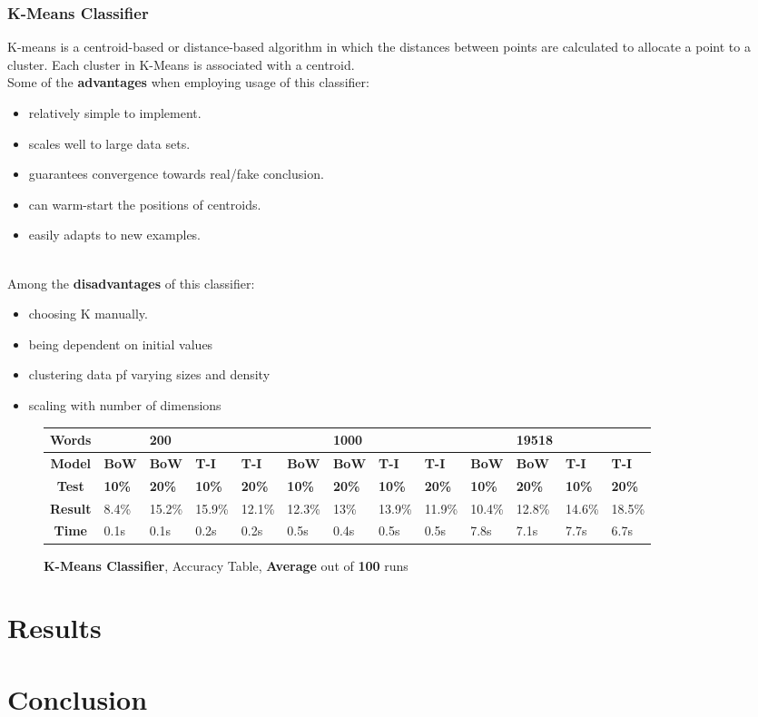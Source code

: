 \documentclass{article}
\begin{document}
	\subsubsection{K-Means Classifier}
K-means is a centroid-based or distance-based algorithm in which the distances between points are calculated to allocate a point to a cluster.
Each cluster in K-Means is associated with a centroid. \\
Some of the \textbf{advantages} when employing usage of this classifier:
\begin{itemize}
\item relatively simple to implement.
\item scales well to large data sets.
\item guarantees convergence towards real/fake conclusion.
\item can warm-start the positions of centroids.
\item easily adapts to new examples.
\end{itemize}
\\
Among the \textbf{disadvantages} of this classifier:
\begin{itemize}
\item choosing K manually.
\item being dependent on initial values
\item clustering data pf varying sizes and density
\item scaling with number of dimensions
\end{itemize}
	\begin{figure}[H]
		\begin{tabular}{||c||l|l|l|l||l|l|l|l||l|l|l|l||}
			\hline
			\textbf{Words} &  & \textbf{200} & & & &\textbf{1000} & & & & \textbf{19518} &  & \\ \hline 
			\textbf{Model} & \textbf{BoW} & \textbf{BoW} & \textbf{T-I} & \textbf{T-I} &\textbf{BoW} & \textbf{BoW} & \textbf{T-I} & \textbf{T-I} & \textbf{BoW} & \textbf{BoW} & \textbf{T-I} & \textbf{T-I}\\ \hline
			\textbf{Test} & \textbf{10\%} & \textbf{20\%} & \textbf{10\%} & \textbf{20\%} & \textbf{10\%} & \textbf{20\%} & \textbf{10\%} & \textbf{20\%} & \textbf{10\%} & \textbf{20\%} & \textbf{10\%} & \textbf{20\%} \\ \hline \hline  
			\textbf{Result} & 8.4\% & 15.2\% & 15.9\% & 12.1\% & 12.3\% & 13\% & 13.9\% & 11.9\% & 10.4\% & 12.8\% & 14.6\% & 18.5\% \\ \hline 
			\textbf{Time} &0.1s & 0.1s & 0.2s & 0.2s & 0.5s & 0.4s & 0.5s & 0.5s & 7.8s & 7.1s & 7.7s & 6.7s \\ \hline 
		\end{tabular}
		\caption{\textbf{K-Means Classifier}, Accuracy Table, \textbf{Average} out of \textbf{100} runs}
	\end{figure}

	\section{Results}
	
	\section{Conclusion}
	
	\begin{thebibliography}{9}

		
	\end{thebibliography}  
\end{document}
